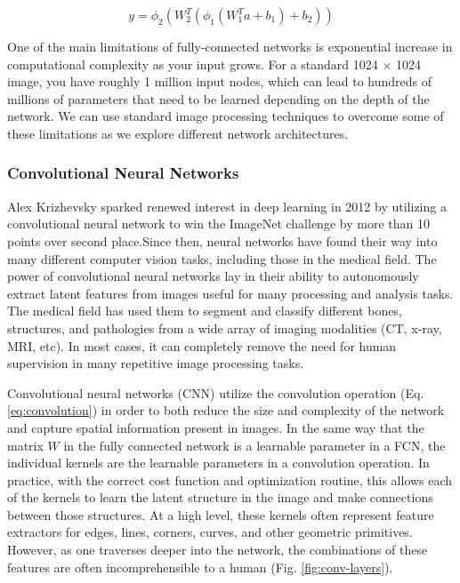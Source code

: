 \begin{equation}
    y = \phi_2 (W_2^{T}(\phi_1(W_1^{T}a + b_1) + b_2))
    \label{eq:2-layer-fcn}
\end{equation}

One of the main limitations of fully-connected networks is exponential increase in computational complexity as your input grows. For a standard 1024 $\times$ 1024 image, you have roughly 1 million input nodes, which can lead to hundreds of millions of parameters that need to be learned depending on the depth of the network. We can use standard image processing techniques to overcome some of these limitations as we explore different network architectures.

\subsubsection{Convolutional Neural Networks}

Alex Krizhevsky sparked renewed interest in deep learning in 2012 by utilizing a convolutional neural network to win the ImageNet challenge \cite{russakovskyImageNetLargeScale2015} by more than 10 points over second place.Since then, neural networks have found their way into many different computer vision tasks, including those in the medical field. The power of convolutional neural networks lay in their ability to autonomously extract latent features from images useful for many processing and analysis tasks. The medical field has used them to segment and classify different bones, structures, and pathologies from a wide array of imaging modalities (CT, x-ray, MRI, etc). In most cases, it can completely remove the need for human supervision in many repetitive image processing tasks.

Convolutional neural networks (CNN) utilize the convolution operation (Eq. \ref{eq:convolution}) in order to both reduce the size and complexity of the network and capture spatial information present in images. In the same way that the matrix $W$ in the fully connected network is a learnable parameter in a FCN, the individual kernels are the learnable parameters in a convolution operation. In practice, with the correct cost function and optimization routine, this allows each of the kernels to learn the latent structure in the image and make connections between those structures. At a high level, these kernels often represent feature extractors for edges, lines, corners, curves, and other geometric primitives. However, as one traverses deeper into the network, the combinations of these features are often incomprehensible to a human (Fig. \ref{fig:conv-layers}). 

